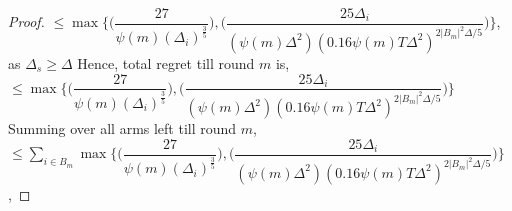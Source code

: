 \begin{proof}
\newline
$\leq \max{\bigg\lbrace \bigg(\dfrac{27}{\psi(m)(\Delta_{i})^{\frac{3}{5}}}\bigg) ,\bigg(\dfrac{25\Delta_{i}}{(\psi(m)\Delta^{2})(0.16\psi(m)T\Delta^{2})^{2|B_{m}|^{2}\Delta/5}}\bigg)\bigg\rbrace}$, as $\Delta_{s}\geq \Delta$
Hence, total regret till round $m$ is,
\newline
$\leq \max{\bigg\lbrace \bigg(\dfrac{27}{\psi(m)(\Delta_{i})^{\frac{3}{5}}}\bigg) ,\bigg(\dfrac{25\Delta_{i}}{(\psi(m)\Delta^{2})(0.16\psi(m)T\Delta^{2})^{2|B_{m}|^{2}\Delta/5}}\bigg)\bigg\rbrace}$
\newline
Summing over all arms left till round $m$,
\newline
$\leq \sum_{i\in B_{m}}\max{\bigg\lbrace \bigg(\dfrac{27}{\psi(m)(\Delta_{i})^{\frac{3}{5}}}\bigg) ,\bigg(\dfrac{25\Delta_{i}}{(\psi(m)\Delta^{2})(0.16\psi(m)T\Delta^{2})^{2|B_{m}|^{2}\Delta/5}}\bigg)\bigg\rbrace}$, 

\end{proof}
